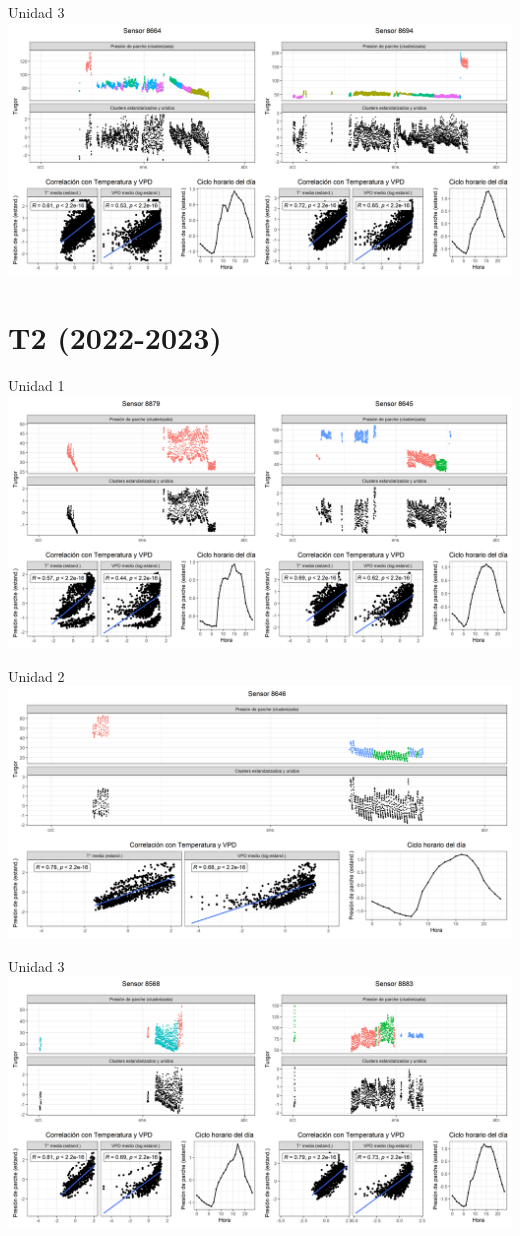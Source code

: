 \documentclass[
  letterpaper,
  DIV=11,
  numbers=noendperiod]{scrreprt}
\begin{document}
Unidad 3
\includegraphics{figuras/03_turgor_union/2022_2023_Rio_Claro_T1_Unidad_3.png}

\chapter{T2 (2022-2023)}

Unidad 1
\includegraphics{figuras/03_turgor_union/2022_2023_Rio_Claro_T2_Unidad_1.png}

Unidad 2
\includegraphics{figuras/03_turgor_union/2022_2023_Rio_Claro_T2_Unidad_2.png}

Unidad 3
\includegraphics{figuras/03_turgor_union/2022_2023_Rio_Claro_T2_Unidad_3.png}
\end{document}
